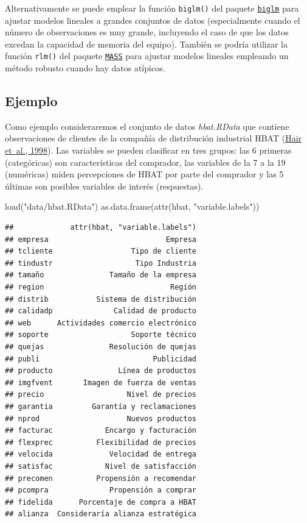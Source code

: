 \documentclass[
  spanish,
]{book}
\newenvironment{Shaded}{\begin{snugshade}}{\end{snugshade}}
\newcommand{\FunctionTok}[1]{\textcolor[rgb]{0.00,0.00,0.00}{#1}}
\newcommand{\NormalTok}[1]{#1}
\newcommand{\StringTok}[1]{\textcolor[rgb]{0.31,0.60,0.02}{#1}}
\theoremstyle{break}
\theoremstyle{definition}
\theoremstyle{definition}
\theoremstyle{definition}
\theoremstyle{definition}
\theoremstyle{remark}
\begin{document}
Alternativamente se puede emplear la función \texttt{biglm()} del paquete \href{https://CRAN.R-project.org/package=biglm}{\texttt{biglm}} para ajustar modelos lineales a grandes conjuntos de datos (especialmente cuando el número de observaciones es muy grande, incluyendo el caso de que los datos excedan la capacidad de memoria del equipo).
También se podría utilizar la función \texttt{rlm()} del paquete \href{https://CRAN.R-project.org/package=MASS}{\texttt{MASS}} para ajustar modelos lineales empleando un método robusto cuando hay datos atípicos.

\hypertarget{ejemplo-2}{%
\subsection{Ejemplo}\label{ejemplo-2}}

Como ejemplo consideraremos el conjunto de datos \emph{hbat.RData} que contiene observaciones de clientes de la compañía de distribución industrial HBAT (\protect\hyperlink{ref-hair1998multivariate}{Hair et~al., 1998}).
Las variables se pueden clasificar en tres grupos: las 6 primeras (categóricas) son características del comprador, las variables de la 7 a la 19 (numéricas) miden percepciones de HBAT por parte del comprador y las 5 últimas son posibles variables de interés (respuestas).

\begin{Shaded}
\begin{Highlighting}[]
\FunctionTok{load}\NormalTok{(}\StringTok{"data/hbat.RData"}\NormalTok{)}
\FunctionTok{as.data.frame}\NormalTok{(}\FunctionTok{attr}\NormalTok{(hbat, }\StringTok{"variable.labels"}\NormalTok{))}
\end{Highlighting}
\end{Shaded}

\begin{verbatim}
##             attr(hbat, "variable.labels")
## empresa                           Empresa
## tcliente                  Tipo de cliente
## tindustr                   Tipo Industria
## tamaño               Tamaño de la empresa
## region                             Región
## distrib           Sistema de distribución
## calidadp              Calidad de producto
## web      Actividades comercio electrónico
## soporte                   Soporte técnico
## quejas               Resolución de quejas
## publi                          Publicidad
## producto               Línea de productos
## imgfvent       Imagen de fuerza de ventas
## precio                   Nivel de precios
## garantia         Garantía y reclamaciones
## nprod                    Nuevos productos
## facturac            Encargo y facturación
## flexprec          Flexibilidad de precios
## velocida             Velocidad de entrega
## satisfac            Nivel de satisfacción
## precomen          Propensión a recomendar
## pcompra              Propensión a comprar
## fidelida      Porcentaje de compra a HBAT
## alianza  Consideraría alianza estratégica
\end{verbatim}
\end{document}
